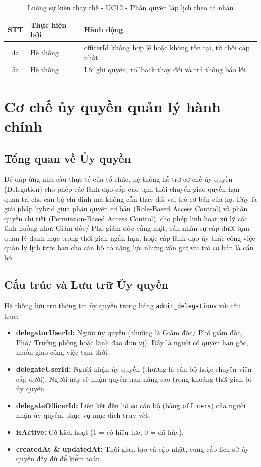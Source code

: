 \documentclass[18pt,a4paper]{report}
\newcommand{\altflowtable}[1]{
\begin{table}[H]
\centering
\caption{Luồng sự kiện thay thế - #1}
\begin{tabularx}{\textwidth}{|c|>{\raggedright\arraybackslash}p{3cm}|X|}
\hline
\textbf{STT} & \textbf{Thực hiện bởi} & \textbf{Hành động} \\ \hline
}
\begin{document}
\altflowtable{UC12 - Phân quyền lập lịch theo cá nhân}
4a & Hệ thống & officerId không hợp lệ hoặc không tồn tại, từ chối cập nhật. \\ \hline
5a & Hệ thống & Lỗi ghi quyền, rollback thay đổi và trả thông báo lỗi. \\ \hline
\end{tabularx}
\end{table}

\section{Cơ chế ủy quyền quản lý hành chính}

\subsection{Tổng quan về Ủy quyền}
Để đáp ứng nhu cầu thực tế của tổ chức, hệ thống hỗ trợ cơ chế ủy quyền (Delegation) cho phép các lãnh đạo cấp cao tạm thời chuyển giao quyền hạn quản trị cho cán bộ chỉ định mà không cần thay đổi vai trò cơ bản của họ. Đây là giải pháp hybrid giữa phân quyền cơ bản (Role-Based Access Control) và phân quyền chi tiết (Permission-Based Access Control), cho phép linh hoạt xử lý các tình huống như: Giám đốc/ Phó giám đốc vắng mặt, cần nhân sự cấp dưới tạm quản lý danh mục trong thời gian ngắn hạn, hoặc cấp lãnh đạo ủy thác công việc quản lý lịch trực ban cho cán bộ có năng lực nhưng vẫn giữ vai trò cơ bản là cán bộ.

\subsection{Cấu trúc và Lưu trữ Ủy quyền}
Hệ thống lưu trữ thông tin ủy quyền trong bảng \texttt{admin\_delegations} với cấu trúc:

\begin{itemize}[leftmargin=1.2cm]
    \item \textbf{delegatorUserId:} Người ủy quyền (thường là Giám đốc/ Phó giám đốc, Phó/ Trưởng phòng hoặc lãnh đạo đơn vị). Đây là người có quyền hạn gốc, muốn giao công việc tạm thời.
    \item \textbf{delegateUserId:} Người nhận ủy quyền (thường là cán bộ hoặc chuyên viên cấp dưới). Người này sẽ nhận quyền hạn nâng cao trong khoảng thời gian bị ủy quyền.
    \item \textbf{delegateOfficerId:} Liên kết đến hồ sơ cán bộ (bảng \texttt{officers}) của người nhận ủy quyền, phục vụ mục đích truy vết.
    \item \textbf{isActive:} Cờ kích hoạt (1 = có hiệu lực, 0 = đã hủy).
    \item \textbf{createdAt \& updatedAt:} Thời gian tạo và cập nhật, cung cấp lịch sử ủy quyền đầy đủ để kiểm toán.
\end{itemize}
\end{document}
